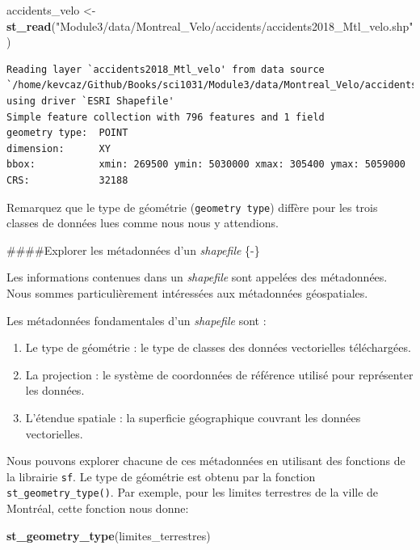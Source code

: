\documentclass[
  12pt,
]{krantz}
\newenvironment{Shaded}{\begin{snugshade}}{\end{snugshade}}
\newcommand{\KeywordTok}[1]{\textcolor[rgb]{0.13,0.29,0.53}{\textbf{#1}}}
\newcommand{\NormalTok}[1]{#1}
\newcommand{\StringTok}[1]{\textcolor[rgb]{0.31,0.60,0.02}{#1}}
\providecommand{\tightlist}{%
  \setlength{\itemsep}{0pt}\setlength{\parskip}{0pt}}
\begin{document}
\begin{Shaded}
\begin{Highlighting}[]
\NormalTok{accidents_velo <-}\StringTok{ }\KeywordTok{st_read}\NormalTok{(}\StringTok{"Module3/data/Montreal_Velo/accidents/accidents2018_Mtl_velo.shp"}\NormalTok{)}
\end{Highlighting}
\end{Shaded}

\begin{verbatim}
Reading layer `accidents2018_Mtl_velo' from data source `/home/kevcaz/Github/Books/sci1031/Module3/data/Montreal_Velo/accidents/accidents2018_Mtl_velo.shp' using driver `ESRI Shapefile'
Simple feature collection with 796 features and 1 field
geometry type:  POINT
dimension:      XY
bbox:           xmin: 269500 ymin: 5030000 xmax: 305400 ymax: 5059000
CRS:            32188
\end{verbatim}

Remarquez que le type de géométrie (\texttt{geometry\ type}) diffère pour les trois classes de données lues comme nous nous y attendions.

\#\#\#\#Explorer les métadonnées d'un \emph{shapefile} \{-\}

Les informations contenues dans un \emph{shapefile} sont appelées des métadonnées. Nous sommes particulièrement intéressées aux métadonnées géospatiales.

Les métadonnées fondamentales d'un \emph{shapefile} sont :

\begin{enumerate}
\def\labelenumi{\arabic{enumi}.}
\tightlist
\item
  Le type de géométrie : le type de classes des données vectorielles téléchargées.
\item
  La projection : le système de coordonnées de référence utilisé pour représenter les données.
\item
  L'étendue spatiale : la superficie géographique couvrant les données vectorielles.
\end{enumerate}

Nous pouvons explorer chacune de ces métadonnées en utilisant des fonctions de la librairie \texttt{sf}. Le type de géométrie est obtenu par la fonction \texttt{st\_geometry\_type()}. Par exemple, pour les limites terrestres de la ville de Montréal, cette fonction nous donne:

\begin{Shaded}
\begin{Highlighting}[]
\KeywordTok{st_geometry_type}\NormalTok{(limites_terrestres)}
\end{Highlighting}
\end{Shaded}
\end{document}
